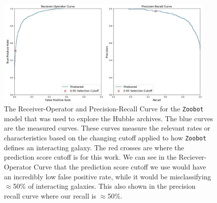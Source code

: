 \begin{figure}
  \centering
  \includegraphics[width = 0.95\textwidth]{Chapter2/figures/fig14.jpg}
  \caption[The Receiver-Operator and Precision-Recall Curve for the \texttt{Zoobot} model that was used to explore the Hubble archives.]{The Receiver-Operator and Precision-Recall Curve for the \texttt{Zoobot} model that was used to explore the Hubble archives. The blue curves are the measured curves. These curves measure the relevant rates or characteristics based on the changing cutoff applied to how \texttt{Zoobot} defines an interacting galaxy. The red crosses are where the prediction score cutoff is for this work. We can see in the Reciever-Operator Curve that the prediction score cutoff we use would have an incredibly low false positive rate, while it would be misclassifying $\approx$50\% of interacting galaxies. This also shown in the precision recall curve where our recall is $\approx$50\%.}
  \label{fig:pr-roc-curves}
\end{figure}

